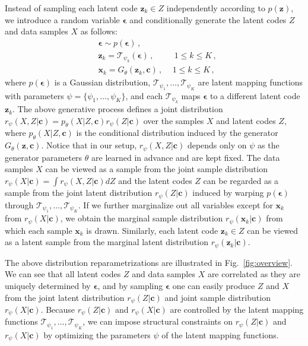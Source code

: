 \documentclass[runningheads]{llncs}
\begin{document}
	Instead of sampling each latent code $\mathbf{z}_k \in Z$ independently according to $p(\mathbf{z})$, we introduce a random variable $\boldsymbol{\epsilon}$ and conditionally generate the latent codes $Z$ and data samples $X$ as follows:
	\begin{align}
	& \boldsymbol{\epsilon} \sim p(\boldsymbol{\epsilon})\,, \\
	& \mathbf{z} _k = \mathcal{T}_{\psi_k}(\boldsymbol{\epsilon}) \,,\;\, \quad \quad 1 \leq k \leq K\,, \\
	& \mathbf{x} _k = G_\theta(\mathbf{z}_k, \mathbf{c})\,,	\,\quad 1 \leq k \leq K\,,
	\end{align}
	where $p(\boldsymbol{\epsilon})$ is a Gaussian distribution, $\mathcal{T}_{\psi_1}, \ldots, \mathcal{T}_{\psi_K}$ are latent mapping functions with parameters $\psi = \{ \psi_1, \ldots, \psi_K \}$, and each $\mathcal{T}_{\psi_k}$ maps $\boldsymbol{\epsilon}$ to a different latent code $\mathbf{z}_k$.
	The above generative process defines a joint distribution $r_\psi(X,Z|\mathbf{c})=p_\theta(X|Z, \mathbf{c})r_\psi(Z|\mathbf{c})$ over the samples $X$ and latent codes $Z$, where $p_\theta(X|Z,\mathbf{c})$ is the conditional distribution induced by the generator $G_\theta(\mathbf{z}, \mathbf{c})$. Notice that in our setup, $r_\psi(X,Z|\mathbf{c})$ depends only on $\psi$ as the generator parameters $\theta$ are learned in advance and are kept fixed. The data samples $X$ can be viewed as a sample from the joint sample distribution $r_\psi(X|\mathbf{c})=\int r_\psi(X,Z|\mathbf{c})dZ$ and the latent codes $Z$ can be regarded as a sample from the joint latent distribution $r_\psi(Z|\mathbf{c})$ induced by warping $p(\boldsymbol{\epsilon})$ through $\mathcal{T}_{\psi_1}, \ldots, \mathcal{T}_{\psi_K}$. If we further marginalize out all variables except for $\mathbf{x}_k$ from $r_\psi(X|\mathbf{c})$, we obtain the marginal sample distribution $r_\psi(\mathbf{x}_k|\mathbf{c})$ from which each sample $\mathbf{x}_k$ is drawn. Similarly, each latent code $\mathbf{z}_k \in Z$ can be viewed as a latent sample from the marginal latent distribution $r_\psi(\mathbf{z}_k|\mathbf{c})$.
	
	The above distribution reparametrizations are illustrated in Fig.~\ref{fig:overview}. We can see that all latent codes $Z$ and data samples $X$ are correlated as they are uniquely determined by $\boldsymbol{\epsilon}$, and by sampling $\boldsymbol{\epsilon}$ one can easily produce $Z$ and $X$ from the joint latent distribution $r_\psi(Z|\mathbf{c})$ and joint sample distribution $r_\psi(X|\mathbf{c})$. Because $r_\psi(Z|\mathbf{c})$ and $r_\psi(X|\mathbf{c})$ are controlled by the latent mapping functions $\mathcal{T}_{\psi_1}, \ldots, \mathcal{T}_{\psi_K}$, we can impose structural constraints on $r_\psi(Z|\mathbf{c})$ and $r_\psi(X|\mathbf{c})$ by optimizing the parameters $\psi$ of the latent mapping functions.
	
\end{document}
